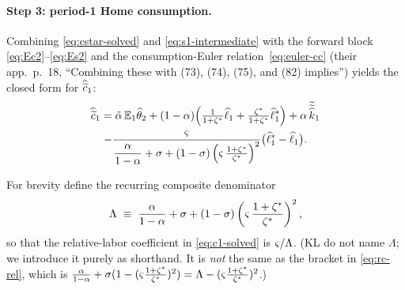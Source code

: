\paragraph{Step 3: period-1 Home consumption.} Combining \eqref{eq:cstar-solved}
and \eqref{eq:s1-intermediate} with the forward block
\eqref{eq:Ec2}--\eqref{eq:Es2} and the consumption-Euler
relation~\eqref{eq:euler-cc} (their app.~p.~18, ``Combining these with (73),
(74), (75), and (82) implies'') yields the closed form for $\widehat{\widetilde{c}}_1$:
\begin{multline}
\widehat{\widetilde{c}}_1 = \tilde{\alpha}\,\mathbb{E}_1\widehat{\theta}_2
+(1-\alpha)\Bigl(\tfrac{1}{1+\zeta^{*}}\widehat{\ell}_1+\tfrac{\zeta^{*}}{1+\zeta^{*}}\widehat{\ell}^{*}_1\Bigr)
+\alpha\,\widetilde{\widetilde{\widehat{k}}}_1\\
-\frac{\varsigma}{\dfrac{\alpha}{1-\alpha}+\sigma+(1-\sigma)\left(\varsigma\,\frac{1+\zeta^{*}}{\zeta^{*}}\right)^2}\bigl(\widehat{\ell}^{*}_1-\widehat{\ell}_1\bigr). \label{eq:c1-solved}
\end{multline}

For brevity define the recurring composite denominator
\begin{equation}
\Lambda \;\equiv\; \frac{\alpha}{1-\alpha}+\sigma+(1-\sigma)\left(\varsigma\,\frac{1+\zeta^{*}}{\zeta^{*}}\right)^2, \label{eq:Lambda-def}
\end{equation}
so that the relative-labor coefficient in \eqref{eq:c1-solved} is
$\varsigma/\Lambda$. (KL do not name $\Lambda$; we introduce it purely as
shorthand. It is \emph{not} the same as the bracket in \eqref{eq:rc-rel}, which
is $\frac{\alpha}{1-\alpha}+\sigma(1-(\varsigma\frac{1+\zeta^{*}}{\zeta^{*}})^2)
=\Lambda-(\varsigma\frac{1+\zeta^{*}}{\zeta^{*}})^2$.)

